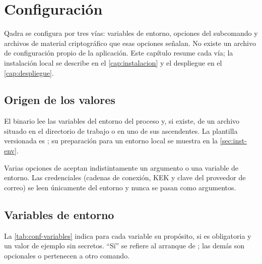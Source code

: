 \chapter{Configuración}\label{cap:configuracion}

Qadra se configura por tres vías: variables de entorno, opciones del
subcomando  y archivos de material criptográfico que esas
opciones señalan. No existe un archivo de configuración propio de la
aplicación. Este capítulo resume cada vía; la instalación local se describe en
el \cref{cap:instalacion} y el despliegue en el \cref{cap:despliegue}.

\section{Origen de los valores}\label{sec:conf-origen}

El binario  lee las variables del entorno del proceso y,
si existe, de un archivo  situado en el directorio de trabajo o
en uno de sus ascendentes.
La plantilla versionada es ; su preparación para un
entorno local se muestra en la \cref{sec:inst-env}.

Varias opciones de  aceptan indistintamente un argumento o una
variable de entorno. Las credenciales (cadenas de conexión, KEK y clave del
proveedor de correo) se leen únicamente del entorno y nunca se pasan como
argumentos.

\section{Variables de entorno}\label{sec:conf-variables}

La \cref{tab:conf-variables} indica para cada variable su propósito, si es
obligatoria y un valor de ejemplo sin secretos. \enquote{Sí} se refiere al
arranque de ; las demás son opcionales o pertenecen a otro
comando.

